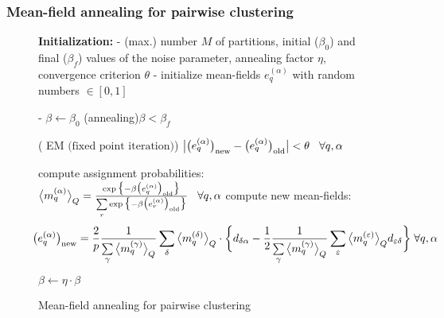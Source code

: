 \begin{frame}[shrink=17] \frametitle{Mean-field annealing for pairwise clustering}
\begin{figure}[!th]
\footnotesize
\removelatexerror
\begin{algorithm}[H]
  \DontPrintSemicolon
  \textbf{Initialization:}\;
  - (max.) number $M$ of partitions, initial  ($\beta_0$) and final  ($\beta_f$) values of the noise parameter, annealing factor  $\eta$,   convergence criterion  $\theta$\;
  - initialize mean-fields  $e_q^{(\alpha)}$ with random numbers $\in [0, 1]$\;

- $\beta \leftarrow \beta_0$\;
\While(annealing){$\beta < \beta_f$}{
\Repeat ( EM $\text{(fixed point iteration)}$){
$\big| \big( e_q^{(\alpha)} \big)_{\mathrm{new}}
	- \big( e_q^{(\alpha)} \big)_{\mathrm{old}} \big| < \theta 
	\hspace{0.3cm}\forall q, \alpha$}{
\hspace{-0.2cm}compute assignment probabilities: 
$ \big< m_q^{(\alpha)} \big>_Q = \frac{ \exp \big\{ -\beta \big(e_q^{(\alpha)}
	\big)_{\mathrm{old}}\big\} }{ \sum\limits_r \exp \big\{ -\beta \big(
	e_r^{(\alpha)} \big)_{\mathrm{old}} \big\} } \hspace{0.3cm}  \forall
	q, \alpha
$\;
\hspace{-0.2cm}compute new mean-fields: 
\hspace{-0.6cm}
$$\hspace{-0.2cm}\big( e_q^{(\alpha)} \big)_{\mathrm{new}} = \frac{2}{p} \frac{1}{
	\sum\limits_{\gamma} \big< m_q^{(\gamma)} \big>_Q } \sum\limits_{\delta}
	\big<m_q^{(\delta)} \big>_Q \cdot \bigg\{ d_{\delta \alpha} - \frac{1}{2} \frac{1}{
		\sum\limits_{\gamma} \big< m_q^{(\gamma)} \big>_Q }
		\sum\limits_{\varepsilon} \big< m_q^{(\varepsilon)}
		\big>_Q d_{\varepsilon \delta} \bigg\} \hspace{0.1cm}\forall q, \alpha$$

}
$\beta \leftarrow \eta \cdot \beta$\;
}
\label{alg:meanFieldClustering}
\caption{Mean-field annealing for pairwise clustering}
\end{algorithm}
\end{figure}
\end{frame}


